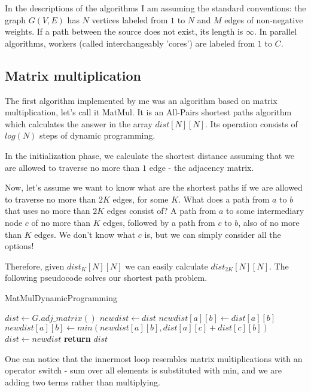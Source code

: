 \documentclass[12pt,a4paper,twoside,openright]{report}
\begin{document}
In the descriptions of the algorithms I am assuming the standard conventions: the graph $G(V,E)$ has $N$ vertices labeled from $1$ to $N$ and $M$ edges of non-negative weights. If a path between the source does not exist, its length is $\infty$. In parallel algorithms, workers (called interchangeably 'cores') are labeled from $1$ to $C$.

\subsection{Matrix multiplication}
The first algorithm implemented by me was an algorithm based on matrix multiplication, let's call it MatMul. It is an All-Pairs shortest paths algorithm which calculates the answer in the array $dist[N][N]$. Its operation consists of $log(N)$ steps of dynamic programming.

In the initialization phase, we calculate the shortest distance assuming that we are allowed to traverse no more than $1$ edge - the adjacency matrix.

Now, let's assume we want to know what are the shortest paths if we are allowed to traverse no more than $2K$ edges, for some $K$. What does a path from $a$ to $b$ that uses no more than $2K$ edges consist of? A path from $a$ to some intermediary node $c$ of no more than $K$ edges, followed by a path from $c$ to $b$, also of no more than $K$ edges. We don't know what $c$ is, but we can simply consider all the options! 

Therefore, given $dist_{K}[N][N]$ we can easily calculate $dist_{2K}[N][N]$. The following pseudocode solves our shortest path problem.

\begin{algorithm}
\caption{MatMulDynamicProgramming}\label{matmuldp}
\begin{algorithmic}[1]
\State $\textit{dist} \gets G.adj\_matrix()$
\State $\textit{newdist} \gets dist$
            \State $newdist[a][b] \gets dist[a][b]$
            \State $newdist[a][b] \gets min(newdist[a][b], dist[a][c] + dist[c][b])$
        \EndFor
        \EndFor
        \EndFor
        \State $dist \gets newdist$
      \EndFor
\State \textbf{return} $dist$
\EndProcedure
\end{algorithmic}
\end{algorithm}

One can notice that the innermost loop resembles matrix multiplications with an operator switch - sum over all elements is substituted with min, and we are adding two terms rather than multiplying.
\end{document}
